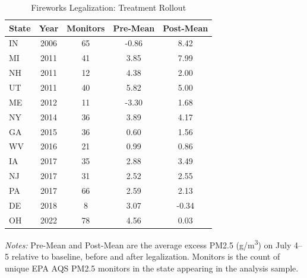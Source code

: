 \begin{table}[H]
\centering
\caption{Fireworks Legalization: Treatment Rollout}
\begin{threeparttable}
\begin{tabular}{lcccc}
\toprule
State & Year & Monitors & Pre-Mean & Post-Mean \\
\midrule
IN & 2006 & 65 & -0.86 & 8.42 \\
MI & 2011 & 41 & 3.85 & 7.99 \\
NH & 2011 & 12 & 4.38 & 2.00 \\
UT & 2011 & 40 & 5.82 & 5.00 \\
ME & 2012 & 11 & -3.30 & 1.68 \\
NY & 2014 & 36 & 3.89 & 4.17 \\
GA & 2015 & 36 & 0.60 & 1.56 \\
WV & 2016 & 21 & 0.99 & 0.86 \\
IA & 2017 & 35 & 2.88 & 3.49 \\
NJ & 2017 & 31 & 2.52 & 2.55 \\
PA & 2017 & 66 & 2.59 & 2.13 \\
DE & 2018 &  8 & 3.07 & -0.34 \\
OH & 2022 & 78 & 4.56 & 0.03 \\
\bottomrule
\end{tabular}
\begin{tablenotes}[flushleft]
\small
\item \textit{Notes:} Pre-Mean and Post-Mean are the average excess PM2.5 (\textmu g/m\textsuperscript{3}) on July 4--5 relative to baseline, before and after legalization. Monitors is the count of unique EPA AQS PM2.5 monitors in the state appearing in the analysis sample.
\end{tablenotes}
\end{threeparttable}
\label{tab:rollout}
\end{table}
